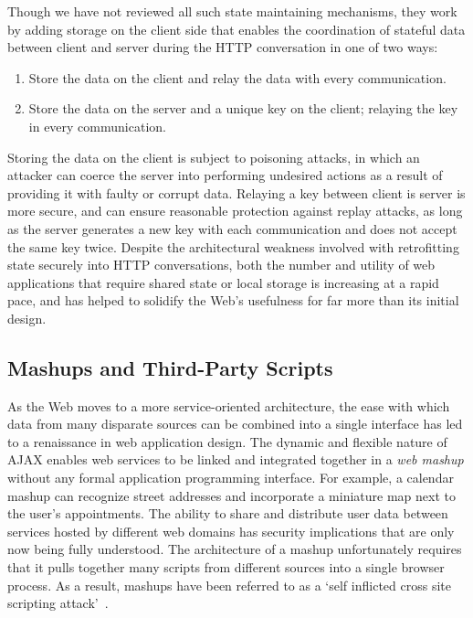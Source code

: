 \documentclass{acmtrans2m}
\begin{document}
Though we have not reviewed all such state maintaining mechanisms, they work by adding storage on the client side that enables the coordination of stateful data between client and server during the HTTP conversation in one of two ways:
\begin{enumerate}
 \item Store the data on the client and relay the data with every communication.
 \item Store the data on the server and a unique key on the client; relaying the key in every communication.
\end{enumerate}

Storing the data on the client is subject to poisoning attacks, in which an attacker can coerce the server into performing undesired actions as a result of providing it with faulty or corrupt data.
Relaying a key between client is server is more secure, and can ensure reasonable protection against replay attacks, as long as the server generates a new key with each communication and does not accept the same key twice.
Despite the architectural weakness involved with retrofitting state securely into HTTP conversations, both the number and utility of web applications that require shared state or local storage is increasing at a rapid pace, and has helped to solidify the Web's usefulness for far more than its initial design.

\subsection{Mashups and Third-Party Scripts}\label{sec:mashups}

As the Web moves to a more service-oriented architecture, the ease with which data from many disparate sources can be combined into a single interface has led to a renaissance in web application design.
The dynamic and flexible nature of AJAX enables web services to be linked and integrated together in a \emph{web mashup} without any formal application programming interface.
For example, a calendar mashup can recognize street addresses and incorporate a miniature map next to the user's appointments.
The ability to share and distribute user data between services hosted by different web domains has security implications that are only now being fully understood.
The architecture of a mashup unfortunately requires that it pulls together many scripts from different sources into a single browser process.
As a result, mashups have been referred to as a `self inflicted cross site scripting attack'~\cite{mashup}.
\end{document}
